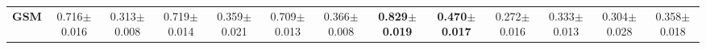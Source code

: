 \documentclass[11pt]{article}
\begin{document}
\begin{table*}[ ]
{\begin{tabular}{c|cccc|cccc|cccc|}
\textbf{GSM}                                                & 0.716$\pm$0.016                                                    & 0.313$\pm$0.008                                                 & 0.719$\pm$0.014                                                     & 0.359$\pm$0.021                                                  & 0.709$\pm$0.013                                                    & 0.366$\pm$0.008                                                 & \textbf{0.829$\pm$0.019}                                                     & \textbf{0.470$\pm$0.017}                                                  & 0.272$\pm$0.016                                                    & 0.333$\pm$0.013                                                 & 0.304$\pm$0.028                                                     & 0.358$\pm$0.018                                                  \\


\end{tabular}}
\end{table*}
\end{document}
